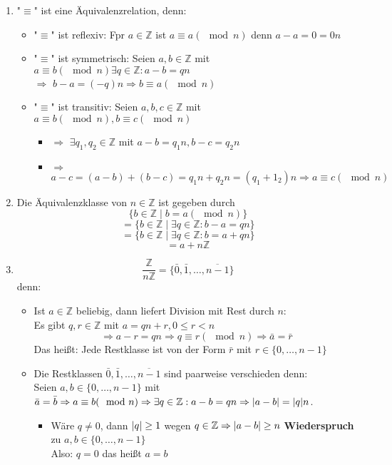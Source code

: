 \documentclass[a4paper]{scrartcl}
\DeclarePairedDelimiter\abs{\lvert}{\rvert}%
\theoremstyle{definition}
\theoremstyle{plain}
\theoremstyle{plain}
\theoremstyle{remark}
\theoremstyle{remark}
\theoremstyle{remark}
\begin{document}
\begin{enumerate}
\item "$\equiv$" ist eine Äquivalenzrelation, denn:
\begin{itemize}
\item "$\equiv$" ist reflexiv: Fpr $a\in\mathbb{Z}$ ist $a\equiv a(\mod n)$ denn $a - a = 0 = 0 n$
\item "$\equiv$" ist symmetrisch: Seien $a,b\in\mathbb{Z}$ mit $a\equiv b(\mod n) \exists q\in\mathbb{Z}:a - b = q n$ \\
           $\Rightarrow$ $b - a = (-q) n \Rightarrow b \equiv a(\mod n)$
\item "$\equiv$" ist transitiv: Seien $a,b,c\in\mathbb{Z}$ mit $a\equiv b(\mod n), b\equiv c(\mod n)$
\begin{itemize}
\item $\Rightarrow$ $\exists q_1,q_2 \in\mathbb{Z}$ mit $a - b = q_1 n, b - c = q_2 n$
\item $\Rightarrow$ $a - c = (a - b) + (b - c) = q_1 n + q_2 n = (q_1 + 1_2) n \Rightarrow a \equiv c(\mod n)$
\end{itemize}
\end{itemize}
\item Die Äquivalenzklasse von $n\in\mathbb{Z}$ ist gegeben durch
\[\{b\in\mathbb{Z} \mid b = a(\mod n)\}\]
\[= \{b\in\mathbb{Z} \mid \exists q\in\mathbb{Z}:b - a = qn\}\]
\[= \{b\in\mathbb{Z} \mid \exists q\in\mathbb{Z}:b = a + q n\}\]
\[= a + n\mathbb{Z} \]
\item \[\frac{\mathbb{Z}}{n\mathbb{Z}} = \{\bar 0, \bar 1, \ldots, \overline{n - 1}\}\]
         denn:
\begin{itemize}
\item Ist $a\in\mathbb{Z}$ beliebig, dann liefert Division mit Rest durch $n$: \\
           Es gibt $q,r\in\mathbb{Z}$ mit $a = q n + r,0\leq r < n$
           \[\Rightarrow a - r = q n \Rightarrow q \equiv r(\mod n) \Rightarrow \bar a = \bar r\]
           Das heißt: Jede Restklasse ist von der Form $\bar r$ mit $r\in \{0,\ldots,n - 1\}$ \\
\item Die Restklassen $\bar 0, \bar 1, \ldots, \overline{n - 1}$ sind paarweise verschieden denn: \\
           Seien $a,b\in\{0,\ldots,n - 1\}$ mit $\bar a = \bar b \Rightarrow a \equiv b(\mod n) \Rightarrow \exists q\in \mathbb{Z}: a - b = q n \Rightarrow \abs{a - b} = \abs{q} n$.
\begin{itemize}
\item Wäre $q\neq 0$, dann $\abs{q} \geq 1$ wegen $q\in\mathbb{Z} \Rightarrow \abs{a - b} \geq n$ \textbf{Wiederspruch} zu $a,b\in\{0,\ldots,n - 1\}$ \\
             Also: $q = 0$ das heißt $a = b$
\end{itemize}
\end{itemize}
\end{enumerate}
\end{document}
